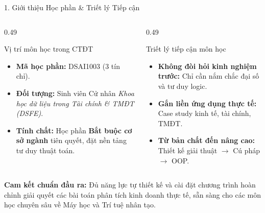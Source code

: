 \documentclass[aspectratio=169, 10pt]{beamer}
\begin{document}
\begin{frame}{1. Giới thiệu Học phần \& Triết lý Tiếp cận}
  \begin{columns}[T]
    \begin{column}{0.49\textwidth}
      \begin{cbox}[primaryblue]{Vị trí môn học trong CTĐT}
        \small
        \begin{itemize}\setlength{\itemsep}{2pt}
          \item \textbf{Mã học phần:} DSAI1003 (3 tín chỉ).
          \item \textbf{Đối tượng:} Sinh viên Cử nhân \textit{Khoa học dữ liệu trong Tài chính \& TMĐT (DSFE)}.
          \item \textbf{Tính chất:} Học phần \textbf{Bắt buộc cơ sở ngành} tiên quyết, đặt nền tảng tư duy thuật toán.
        \end{itemize}
      \end{cbox}
    \end{column}
    \begin{column}{0.49\textwidth}
      \begin{cbox}[secondarygreen]{Triết lý tiếp cận môn học}
        \small
        \begin{itemize}\setlength{\itemsep}{2pt}
          \item \textbf{Không đòi hỏi kinh nghiệm trước:} Chỉ cần nắm chắc đại số và tư duy logic.
          \item \textbf{Gắn liền ứng dụng thực tế:} Case study kinh tế, tài chính, TMĐT.
          \item \textbf{Từ bản chất đến nâng cao:} Thiết kế giải thuật $\rightarrow$ Cú pháp $\rightarrow$ OOP.
        \end{itemize}
      \end{cbox}
    \end{column}
  \end{columns}
  \vspace{0.12cm}
  \begin{tcolorbox}[colback=primaryblue!8, colframe=primaryblue!60, arc=3pt, left=8pt, right=8pt, top=3pt, bottom=3pt]
    \footnotesize
    \textbf{Cam kết chuẩn đầu ra:} Đủ năng lực tự thiết kế và cài đặt chương trình hoàn chỉnh giải quyết các bài toán phân tích kinh doanh thực tế, sẵn sàng cho các môn học chuyên sâu về Máy học và Trí tuệ nhân tạo.
  \end{tcolorbox}
\end{frame}
\end{document}
